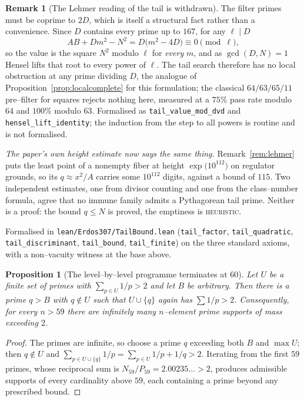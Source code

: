 \documentclass[11pt]{article}
\newtheorem{proposition}[theorem]{Proposition}
\theoremstyle{definition}
\newtheorem{remark}[theorem]{Remark}
\begin{document}
\begin{remark}[The Lehmer reading of the tail is withdrawn]
The filter primes must be coprime to $2D$, which is itself a structural fact rather than a
convenience. Since $D$ contains every prime up to $167$, for any $\ell\mid D$
\[ AB+Dm^2-N^2=D\bigl(m^2-4D\bigr)\equiv0 \pmod{\ell}, \]
so the value is the square $N^2$ modulo $\ell$ for \emph{every} $m$, and as $\gcd(D,N)=1$ Hensel
lifts that root to every power of $\ell$. The tail search therefore has no local obstruction at any
prime dividing $D$, the analogue of Proposition~\ref{prop:localcomplete} for this formulation; the
classical $64/63/65/11$ pre--filter for squares rejects nothing here, measured at a $75\%$ pass rate
modulo $64$ and $100\%$ modulo $63$. Formalised as \texttt{tail\_value\_mod\_dvd} and
\texttt{hensel\_lift\_identity}; the induction from the step to all powers is routine and is not
formalised.

\emph{The paper's own height estimate now says the same thing.} Remark~\ref{rem:lehmer} puts the
least point of a nonempty fiber at height $\exp\bigl(10^{112}\bigr)$ on regulator grounds, so its
$q\approx x^2/A$ carries some $10^{112}$ digits, against a bound of $115$. Two independent estimates,
one from divisor counting and one from the class--number formula, agree that no immune family admits
a Pythagorean tail prime. Neither is a proof: the bound $q\le N$ is proved, the emptiness is
\textsc{heuristic}.

Formalised in \texttt{lean/Erdos307/TailBound.lean} (\texttt{tail\_factor}, \texttt{tail\_quadratic},
\texttt{tail\_discriminant}, \texttt{tail\_bound}, \texttt{tail\_finite}) on the three standard
axioms, with a non--vacuity witness at the base above.
\end{remark}

\begin{proposition}[The level--by--level programme terminates at $60$]\label{prop:levelbarrier}
Let $U$ be a finite set of primes with $\sum_{p\in U}1/p>2$ and let $B$ be arbitrary. Then there is a
prime $q>B$ with $q\notin U$ such that $U\cup\{q\}$ again has $\sum 1/p>2$. Consequently, for every
$n>59$ there are infinitely many $n$--element prime supports of mass exceeding $2$.
\end{proposition}

\begin{proof}
The primes are infinite, so choose a prime $q$ exceeding both $B$ and $\max U$; then $q\notin U$ and
$\sum_{p\in U\cup\{q\}}1/p=\sum_{p\in U}1/p+1/q>2$. Iterating from the first $59$ primes, whose
reciprocal sum is $N_{59}/P_{59}=2.00235\ldots>2$, produces admissible supports of every cardinality
above $59$, each containing a prime beyond any prescribed bound.
\end{proof}
\end{document}
